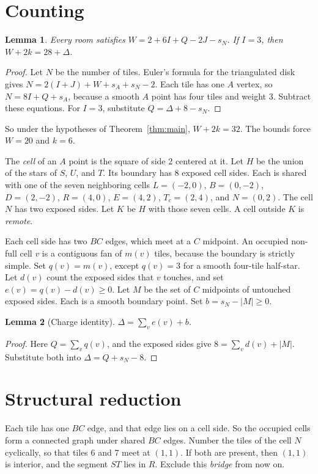 \documentclass[11pt]{article}
\newtheorem{lemma}{Lemma}
\theoremstyle{remark}
\begin{document}
\section{Counting}\label{sec:counting}
\begin{lemma}\label{lem:count}
Every room satisfies $W=2+6I+Q-2J-s_N$. If $I=3$, then $W+2k=28+\Delta$.
\end{lemma}
\begin{proof}
Let $N$ be the number of tiles. Euler's formula for the triangulated disk gives $N=2(I+J)+W+s_A+s_N-2$. Each tile has one $A$ vertex, so $N=8I+Q+s_A$, because a smooth $A$ point has four tiles and weight 3. Subtract these equations. For $I=3$, substitute $Q=\Delta+8-s_N$.
\end{proof}
So under the hypotheses of Theorem~\ref{thm:main}, $W+2k=32$. The bounds force $W=20$ and $k=6$.

The \emph{cell} of an $A$ point is the square of side 2 centered at it. Let $H$ be the union of the stars of $S$, $U$, and $T$. Its boundary has 8 exposed cell sides. Each is shared with one of the seven neighboring cells $L=(-2,0)$, $B=(0,-2)$, $D=(2,-2)$, $R=(4,0)$, $E=(4,2)$, $T_c=(2,4)$, and $N=(0,2)$. The cell $N$ has two exposed sides. Let $K$ be $H$ with those seven cells. A cell outside $K$ is \emph{remote}.

Each cell side has two $BC$ edges, which meet at a $C$ midpoint. An occupied non-full cell $v$ is a contiguous fan of $m(v)$ tiles, because the boundary is strictly simple. Set $q(v)=m(v)$, except $q(v)=3$ for a smooth four-tile half-star. Let $d(v)$ count the exposed sides that $v$ touches, and set $e(v)=q(v)-d(v)\ge0$. Let $M$ be the set of $C$ midpoints of untouched exposed sides. Each is a smooth boundary point. Set $b=s_N-|M|\ge0$.

\begin{lemma}[Charge identity]\label{lem:charge}
$\Delta=\sum_v e(v)+b$.
\end{lemma}
\begin{proof}
Here $Q=\sum_v q(v)$, and the exposed sides give $8=\sum_v d(v)+|M|$. Substitute both into $\Delta=Q+s_N-8$.
\end{proof}

\section{Structural reduction}\label{sec:structure}
Each tile has one $BC$ edge, and that edge lies on a cell side. So the occupied cells form a connected graph under shared $BC$ edges. Number the tiles of the cell $N$ cyclically, so that tiles 6 and 7 meet at $(1,1)$. If both are present, then $(1,1)$ is interior, and the segment $ST$ lies in $R$. Exclude this \emph{bridge} from now on.
\end{document}
